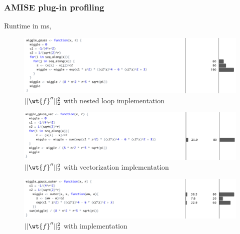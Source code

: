 \section{}
\begin{frame}
	\frametitle{AMISE plug-in profiling}
			Runtime in ms, 
			\begin{figure}
				\centering
				\includegraphics[width=0.7\linewidth]{../images/profile1}
				\caption{$||\wt{f}''||_2^2$ with nested loop implementation}
				\label{fig:profile1}
			\end{figure}
			
			\begin{figure}
				\centering
				\includegraphics[width=0.7\linewidth]{../images/profile2}
				\caption{$||\wt{f}''||_2^2$ with  vectorization implementation}
				\label{fig:profile2}
			\end{figure}
			
			\begin{figure}
				\centering
				\includegraphics[width=0.7\linewidth]{../images/profile3}
				\caption{$||\wt{f}''||_2^2$ with  implementation}
				\label{fig:profile3}
			\end{figure}
\end{frame}


